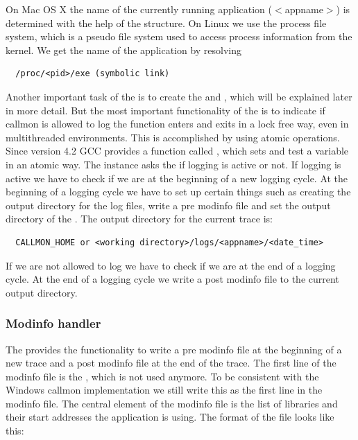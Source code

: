 On Mac OS X the name of the currently running application ($<$appname$>$) is determined with the help of the  structure. On Linux we use the process file system, which is a pseudo file system used to access process information from the kernel. We get the name of the application by resolving 

\begin{verbatim}
  /proc/<pid>/exe (symbolic link)
\end{verbatim}

Another important task of the  is to create the  and , which will be explained later in more detail. But the most important functionality of the  is to indicate if callmon is allowed to log the function enters and exits in a lock free way, even in multithreaded environments. This is accomplished by using atomic operations. Since version 4.2 GCC provides a function called , which sets and test a variable in an atomic way. The  instance asks the  if logging is active or not. If logging is active we have to check if we are at the beginning of a new logging cycle. At the beginning of a logging cycle we have to set up certain things such as creating the output directory for the log files, write a pre modinfo file and set the output directory of the . The output directory for the current trace is:

\begin{verbatim}
  CALLMON_HOME or <working directory>/logs/<appname>/<date_time>
\end{verbatim}

If we are not allowed to log we have to check if we are at the end of a logging cycle. At the end of a logging cycle we write a post modinfo file to the current output directory.

\subsubsection{Modinfo handler}

The  provides the functionality to write a pre modinfo file at the beginning of a new trace and a post modinfo file at the end of the trace. The first line of the modinfo file is the , which is not used anymore. To be consistent with the Windows callmon implementation we still write this as the first line in the modinfo file. The central element of the modinfo file is the list of libraries and their start addresses the application is using. The format of the file looks like this:

